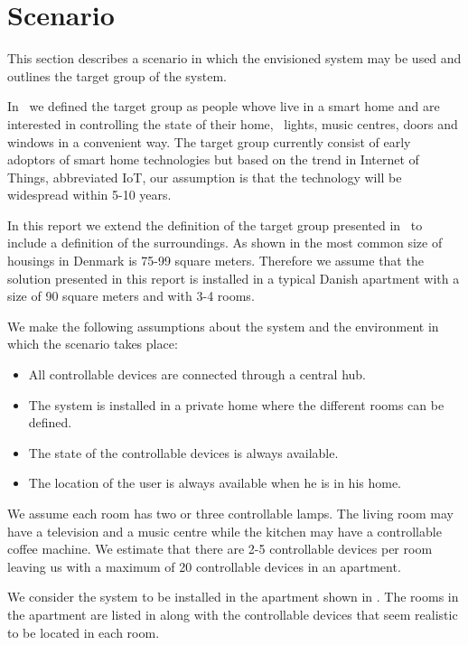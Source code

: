 \section{Scenario}
\label{sec:analysis:scenarios}

This section describes a scenario in which the envisioned system may be used and outlines the target group of the system.

In~\cite[p. 15]{prespecialisation} we defined the target group as people whove live in a smart home and are interested in controlling the state of their home, \eg~lights, music centres, doors and windows in a convenient way. The target group currently consist of early adoptors of smart home technologies but based on the trend in Internet of Things, abbreviated IoT, our assumption is that the technology will be widespread within 5-10 years. 

In this report we extend the definition of the target group presented in~\cite[p. 15]{prespecialisation} to include a definition of the surroundings. As shown in  the most common size of housings in Denmark is 75-99 square meters. Therefore we assume that the solution presented in this report is installed in a typical Danish apartment with a size of 90 square meters and with 3-4 rooms. 

We make the following assumptions about the system and the environment in which the scenario takes place:

\begin{itemize}
    \item All controllable devices are connected through a central hub.
    \item The system is installed in a private home where the different rooms can be defined.
    \item The state of the controllable devices is always available.
    \item The location of the user is always available when he is in his home.
\end{itemize}

We assume each room has two or three controllable lamps. The living room may have a television and a music centre while the kitchen may have a controllable coffee machine. We estimate that there are 2-5 controllable devices per room leaving us with a maximum of 20 controllable devices in an apartment.

We consider the system to be installed in the apartment shown in . The rooms in the apartment are listed in  along with the controllable devices that seem realistic to be located in each room.

